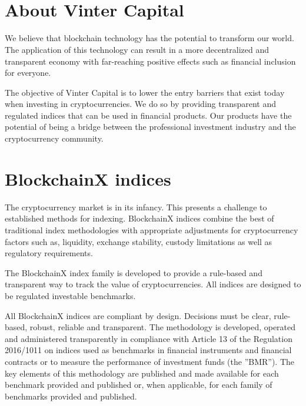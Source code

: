 \documentclass{article}
\begin{document}
\begin{titlepage}
\vspace*{8cm}
\begin{center}
\Huge{\textbf{}}\\[0.6cm]
\Large{\textbf{}}\\[0.6cm]
\large{}
\end{center}
\end{titlepage}
\newpage
\tableofcontents
\newpage

\section{About Vinter Capital}\label{about-vinter-capital}

We believe that blockchain technology has the potential to transform our
world. The application of this technology can result in a more
decentralized and transparent economy with far-reaching positive effects
such as financial inclusion for everyone.

The objective of Vinter Capital is to lower the entry barriers that
exist today when investing in cryptocurrencies. We do so by providing
transparent and regulated indices that can be used in financial
products. Our products have the potential of being a bridge between the
professional investment industry and the cryptocurrency community.

\section{BlockchainX indices}\label{blockchainx-indices}

The cryptocurrency market is in its infancy. This presents a challenge
to established methods for indexing. BlockchainX indices combine the
best of traditional index methodologies with appropriate adjustments for
cryptocurrency factors such as, liquidity, exchange stability, custody
limitations as well as regulatory requirements.

The BlockchainX index family is developed to provide a rule-based and
transparent way to track the value of cryptocurrencies. All indices are
designed to be regulated investable benchmarks.

All BlockchainX indices are compliant by design. Decisions must be
clear, rule-based, robust, reliable and transparent. The methodology is
developed, operated and administered transparently in compliance with
Article 13 of the Regulation 2016/1011 on indices used as benchmarks in
financial instruments and financial contracts or to measure the
performance of investment funds (the ''BMR''). The key elements of this
methodology are published and made available for each benchmark provided
and published or, when applicable, for each family of benchmarks
provided and published.
\end{document}
